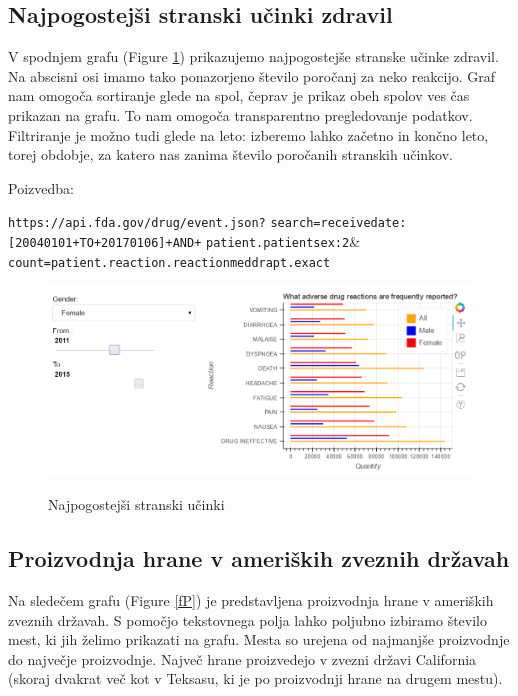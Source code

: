 \documentclass[a4paper,10pt]{article}
\begin{document}
\subsection{Najpogostejši stranski učinki zdravil}
V spodnjem grafu (Figure \ref{reak}) prikazujemo najpogostejše stranske učinke zdravil. Na abscisni osi imamo tako ponazorjeno število poročanj za neko reakcijo. Graf nam omogoča sortiranje glede na spol, čeprav je prikaz obeh spolov ves čas prikazan na grafu. To nam omogoča transparentno pregledovanje podatkov. Filtriranje je možno tudi glede na leto: izberemo lahko začetno in končno leto, torej obdobje, za katero nas zanima število poročanih stranskih učinkov. 

\vspace{5mm}
{\setlength{\parindent}{0cm}
Poizvedba: 
\vspace{5mm}

{\setlength{\parindent}{0cm}
\texttt{https://api.fda.gov/drug/event.json?} \newline \texttt{search=receivedate:[20040101+TO+20170106]+AND+} \newline \texttt{patient.patientsex:2}\& \newline \texttt{count=patient.reaction.reactionmeddrapt.exact} \\
\begin{figure}[H]
  \caption{Najpogostejši stranski učinki}
  \centering
    \includegraphics[width=1\textwidth]{reakcije.png}
    \label{reak}
\end{figure}

\subsection{Proizvodnja hrane v ameriških zveznih državah}
Na sledečem grafu (Figure \ref{fP}) je predstavljena proizvodnja hrane v ameriških zveznih državah. S pomočjo tekstovnega polja lahko poljubno izbiramo število mest, ki jih želimo prikazati na grafu. Mesta so urejena od najmanjše proizvodnje do največje proizvodnje. Največ hrane proizvedejo v zvezni državi California (skoraj dvakrat več kot v Teksasu, ki je po proizvodnji hrane na drugem mestu).

}}
\end{document}
